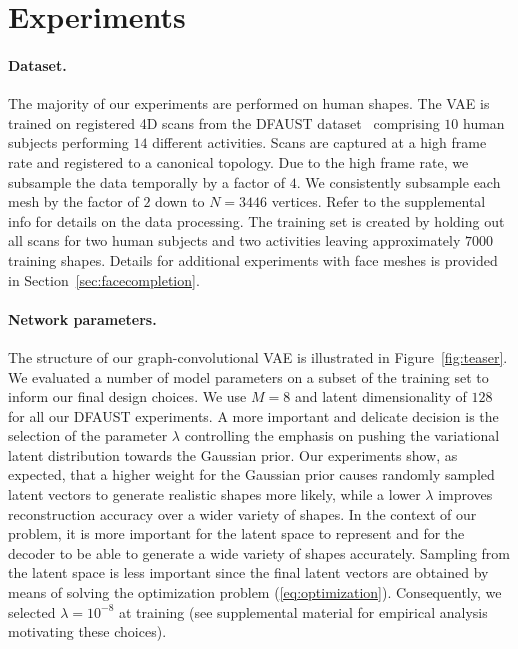\section{Experiments}
\paragraph{Dataset.} 
The majority of our experiments are performed on human shapes. The VAE is trained on registered 4D scans from the DFAUST dataset~\cite{dfaust:CVPR:2017} comprising $10$ human subjects performing $14$ different activities. Scans are captured at a high frame rate and registered to a canonical topology. Due to the high frame rate, we subsample the data temporally by a factor of $4$. We consistently subsample each mesh by the factor of $2$ down to $N=3446$ vertices. Refer to the supplemental info for details on the data processing. The training set is created by holding out all scans for two human subjects and two activities leaving approximately $7000$ training shapes. Details for additional experiments with face meshes is provided in Section~\ref{sec:facecompletion}.

\paragraph{Network parameters.} 
The structure of our graph-convolutional VAE is illustrated in Figure~\ref{fig:teaser}. We evaluated a number of model parameters on a subset of the training set to inform our final design choices. We use $M=8$ and latent dimensionality of $128$ for all our DFAUST experiments.  
A more important and delicate decision is the selection of the parameter $\lambda$ controlling the emphasis on pushing the variational latent distribution towards the Gaussian prior. Our experiments show, as expected, that a higher weight for the Gaussian prior causes randomly sampled latent vectors to generate realistic shapes more likely, while a lower $\lambda$ improves reconstruction accuracy over a wider variety of shapes. In the context of our problem, it is more important for the latent space to represent and for the decoder to be able to generate a wide variety of shapes accurately. Sampling from the latent space is less important since the final latent vectors are obtained by means of solving the optimization problem (\ref{eq:optimization}). Consequently, we selected $\lambda = 10^{-8}$ at training (see supplemental material for empirical analysis motivating these choices).

